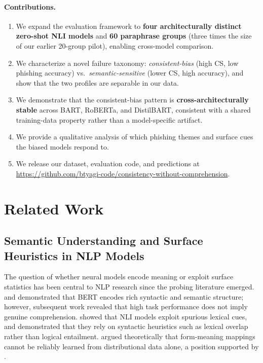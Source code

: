 \documentclass[11pt]{article}
\begin{document}
\paragraph{Contributions.}
\begin{enumerate}[leftmargin=*, itemsep=2pt]
  \item We expand the evaluation framework to \textbf{four architecturally distinct zero-shot NLI models} and \textbf{60 paraphrase groups} (three times the size of our earlier 20-group pilot), enabling cross-model comparison.
  \item We characterize a novel failure taxonomy: \textit{consistent-bias} (high CS, low phishing accuracy) vs.\ \textit{semantic-sensitive} (lower CS, high accuracy), and show that the two profiles are separable in our data.
  \item We demonstrate that the consistent-bias pattern is \textbf{cross-architecturally stable} across BART, RoBERTa, and DistilBART, consistent with a shared training-data property rather than a model-specific artifact.
  \item We provide a qualitative analysis of which phishing themes and surface cues the biased models respond to.
  \item We release our dataset, evaluation code, and predictions at \url{https://github.com/btyagi-code/consistency-without-comprehension}.
\end{enumerate}

\section{Related Work}

\subsection{Semantic Understanding and Surface Heuristics in NLP Models}

The question of whether neural models encode meaning or exploit surface statistics has been central to NLP research since the probing literature emerged. \citet{tenney2019bert} and \citet{jawahar2019does} demonstrated that BERT \citep{devlin2019bert} encodes rich syntactic and semantic structure; however, subsequent work revealed that high task performance does not imply genuine comprehension. \citet{niven2019probing} showed that NLI models exploit spurious lexical cues, and \citet{mccoy2019right} demonstrated that they rely on syntactic heuristics such as lexical overlap rather than logical entailment. \citet{bender2020climbing} argued theoretically that form-meaning mappings cannot be reliably learned from distributional data alone, a position supported by \citet{bender2021dangers}.
\end{document}
